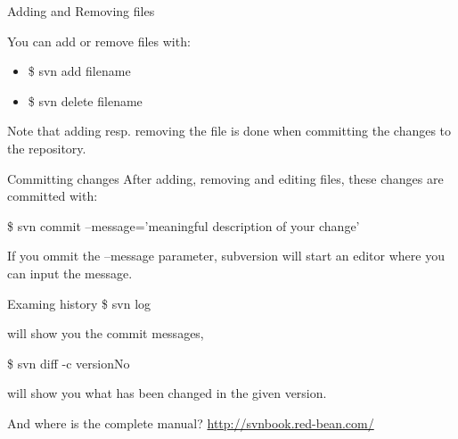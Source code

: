 \documentclass{beamer}
\begin{document}
\begin{frame}{Adding and Removing files}

You can add or remove files with:

\begin{itemize}
   \item \$ svn add filename
   \item \$ svn delete filename
\end{itemize}

Note that adding resp. removing the file is done when committing the changes to the repository.
\end{frame}


\begin{frame}{Committing changes}
   After adding, removing and editing files, these changes are committed with:
   \medskip
   
   \$ svn commit --message='meaningful description of your change'
   \bigskip
   
   If you ommit the --message parameter, subversion will start an editor where
   you can input the message.
\end{frame}


\begin{frame}{Examing history}
   \$ svn log\medskip
   
   will show you the commit messages,\bigskip
   
   \$ svn diff -c versionNo
   
   will show you what has been changed in the given version.
\end{frame}


\begin{frame}{And where is the complete manual?}
    \url{http://svnbook.red-bean.com/ }
\end{frame}
\end{document}

